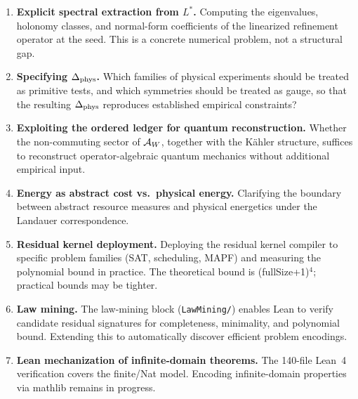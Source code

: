 \begin{enumerate}[label=(\arabic*)]
  \item \textbf{Explicit spectral extraction from $L^*$.}
        Computing the eigenvalues, holonomy classes, and normal-form
        coefficients of the linearized refinement operator at the seed.
        This is a concrete numerical problem, not a structural gap.

  \item \textbf{Specifying $\Delta_{\mathrm{phys}}$.}
        Which families of physical experiments should be treated as primitive
        tests, and which symmetries should be treated as gauge, so that the
        resulting $\Delta_{\mathrm{phys}}$ reproduces established empirical
        constraints?

  \item \textbf{Exploiting the ordered ledger for quantum reconstruction.}
        Whether the non-commuting sector of $\mathcal{A}_W$, together with the
        K\"{a}hler structure, suffices to reconstruct operator-algebraic
        quantum mechanics without additional empirical input.

  \item \textbf{Energy as abstract cost vs.\ physical energy.}
        Clarifying the boundary between abstract resource measures and
        physical energetics under the Landauer correspondence.

  \item \textbf{Residual kernel deployment.}
        Deploying the residual kernel compiler to specific problem families
        (SAT, scheduling, MAPF) and measuring the polynomial bound in
        practice.  The theoretical bound is (fullSize+1)$^4$; practical
        bounds may be tighter.

  \item \textbf{Law mining.}
        The law-mining block (\texttt{LawMining/}) enables Lean to verify
        candidate residual signatures for completeness, minimality, and
        polynomial bound.  Extending this to automatically discover
        efficient problem encodings.

  \item \textbf{Lean mechanization of infinite-domain theorems.}
        The 140-file Lean~4 verification covers the finite/Nat model.
        Encoding infinite-domain properties via mathlib remains in progress.
\end{enumerate}

